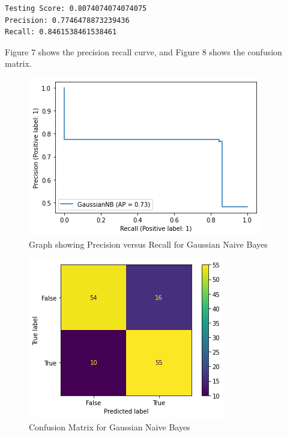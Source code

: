 \documentclass[conference]{IEEEtran}
\begin{document}
\begin{enumerate}
\begin{verbatim}
Testing Score: 0.8074074074074075
Precision: 0.7746478873239436
Recall: 0.8461538461538461
\end{verbatim}
Figure 7 shows the precision recall curve, and Figure 8 shows the confusion matrix. 
\begin{figure}[htbp]
\centerline{\includegraphics[width = \linewidth]{GNB}}
\label{fig7}
\caption{Graph showing Precision versus Recall for Gaussian Naive Bayes}
\end{figure}
\begin{figure}[htbp]
\centerline{\includegraphics[width = \linewidth]{CM_GNB}}
\label{fig8}
\caption{Confusion Matrix for Gaussian Naive Bayes}
\end{figure}

\end{enumerate}
\end{document}
